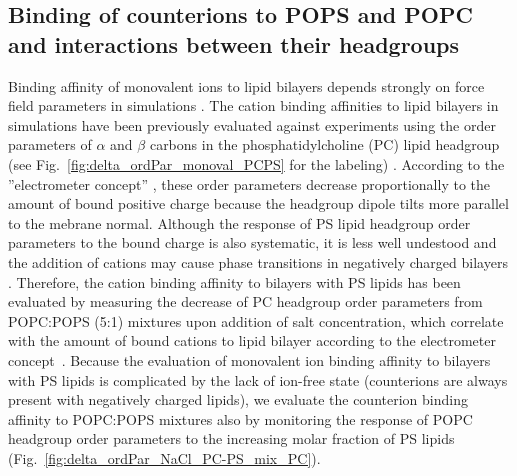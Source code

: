 \documentclass[journal=jctcce,manuscript=article]{achemso}
\begin{document}
\subsection{Binding of counterions to POPS and POPC and interactions between their headgroups}
Binding affinity of monovalent ions to lipid bilayers depends strongly on
force field parameters in simulations \cite{catte16,NMRlipidsIV}.
The cation binding affinities to lipid bilayers in simulations have been previously evaluated
against experiments using the order parameters of $\alpha$ and $\beta$ carbons in the
phosphatidylcholine (PC) lipid headgroup (see Fig.~\ref{fig:delta_ordPar_monoval_PCPS} for the labeling) \cite{catte16,melcr18,NMRlipidsIV}.
According to the ''electrometer concept'' \citep{seelig87}, these order parameters
decrease proportionally to the amount of bound positive charge because the headgroup dipole tilts more
parallel to the mebrane normal.
Although the response of PS lipid headgroup order parameters to the bound charge is also systematic,
it is less well undestood and the addition of cations may cause phase transitions in negatively charged
bilayers \cite{feigenson86,mattai89,roux91,roux90}.
Therefore, the cation binding affinity to bilayers with PS lipids has been evaluated by measuring the decrease
of PC headgroup order parameters from POPC:POPS (5:1) mixtures upon addition of salt concentration,
which correlate with the amount of bound cations to lipid bilayer according to the
electrometer concept~\cite{akutsu81,altenbach84,seelig87,roux90,catte16,NMRlipidsIV}.
Because the evaluation of monovalent ion binding affinity to bilayers with
PS lipids is complicated by the lack of ion-free state (counterions are always present with negatively charged lipids),
we evaluate the counterion binding affinity to POPC:POPS mixtures also by monitoring
the response of POPC headgroup order parameters to the increasing molar fraction of PS lipids~\cite{NMRlipidsIV} 
(Fig.~\ref{fig:delta_ordPar_NaCl_PC-PS_mix_PC}).
\end{document}
